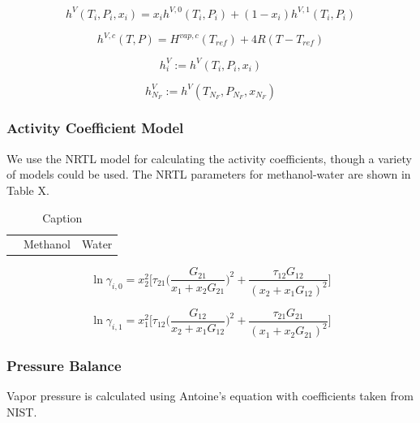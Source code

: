 \begin{equation}
    h^V(T_i, P_i, x_i) = x_i h^{V,0}(T_i,P_i) + (1-x_i) h^{V,1}(T_i,P_i)
\end{equation}


\begin{equation}
    h^{V,c}(T,P) = H^{vap, c}(T_{ref}) + 4R(T-T_{ref})
\end{equation}

\begin{equation}
    h^V_i := h^V(T_i, P_i,x_i)
\end{equation}

\begin{equation}
    h^V_{N_F} := h^V(T_{N_F}, P_{N_F},x_{N_F})
\end{equation}


\subsubsection{Activity Coefficient Model}

We use the NRTL model for calculating the activity coefficients, though a variety of models could be used. The NRTL parameters for methanol-water are shown in Table X.

\begin{table}[]
    \centering
    \begin{tabular}{ccc}
         & Methanol & Water
    \end{tabular}
    \caption{Caption}
    \label{tab:my_label}
\end{table}

\begin{equation}
    \ln \gamma_{i,0} = x_2^2\biggl [\tau_{21} \biggl (\frac{G_{21}}{x_1+x_2G_{21}}\biggr)^2 + \frac{\tau_{12}G_{12}}{(x_2 + x_1 G_{12})^2} \biggr ]
\end{equation}

\begin{equation}
     \ln \gamma_{i,1} = x_1^2\biggl [\tau_{12} \biggl (\frac{G_{12}}{x_2+x_1G_{12}}\biggr)^2 + \frac{\tau_{21}G_{21}}{(x_1 + x_2 G_{21})^2} \biggr ]   
\end{equation}

\subsubsection{Pressure Balance}

Vapor pressure is calculated using Antoine’s equation with coefficients taken from NIST. 

